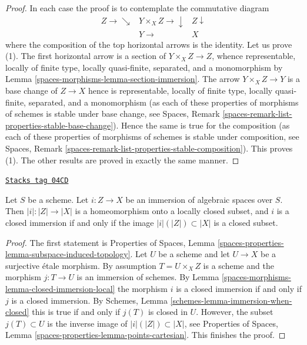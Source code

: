 \begin{proof}
In each case the proof is to contemplate the commutative diagram
$$
\begin{array}{ccc}Z \longrightarrow\searrow & Y \times_X Z \longrightarrow\downarrow & Z \downarrow \\  & Y \longrightarrow & X\end{array}
$$
where the composition of the top horizontal arrows is the identity.
Let us prove (1). The first horizontal arrow is a section of
$Y \times_X Z \to Z$, whence representable, locally of finite type,
locally quasi-finite, separated, and a monomorphism by
Lemma \ref{spaces-morphisms-lemma-section-immersion}.
The arrow $Y \times_X Z \to Y$ is a base change of $Z \to X$
hence is representable, locally of finite type,
locally quasi-finite, separated, and a monomorphism
(as each of these properties of morphisms of schemes is stable
under base change, see
Spaces, Remark \ref{spaces-remark-list-properties-stable-base-change}).
Hence the same is true for the composition (as each of these properties of
morphisms of schemes is stable under composition, see Spaces, Remark
\ref{spaces-remark-list-properties-stable-composition}).
This proves (1). The other results are proved in exactly the same manner.
\end{proof}

\begin{lemma}
\label{spaces-morphisms-lemma-immersion-when-closed}
\href{https://stacks.math.columbia.edu/tag/04CD}{\texttt{Stacks tag 04CD}}

Let $S$ be a scheme. Let $i : Z \to X$ be an immersion of algebraic
spaces over $S$. Then $|i| : |Z| \to |X|$ is a homeomorphism onto a
locally closed subset, and $i$ is a closed immersion if and only if
the image $|i|(|Z|) \subset |X|$ is a closed subset.
\end{lemma}

\begin{proof}
The first statement is Properties of Spaces, Lemma
\ref{spaces-properties-lemma-subspace-induced-topology}.
Let $U$ be a scheme and let $U \to X$ be a surjective \'etale morphism.
By assumption $T = U \times_X Z$ is a scheme and the morphism $j : T \to U$
is an immersion of schemes. By Lemma \ref{spaces-morphisms-lemma-closed-immersion-local}
the morphism $i$ is a closed immersion if and only if $j$ is a closed
immersion. By Schemes, Lemma \ref{schemes-lemma-immersion-when-closed}
this is true if and only if $j(T)$ is closed in $U$.
However, the subset $j(T) \subset U$ is the inverse image of
$|i|(|Z|) \subset |X|$, see
Properties of Spaces, Lemma \ref{spaces-properties-lemma-points-cartesian}.
This finishes the proof.
\end{proof}

